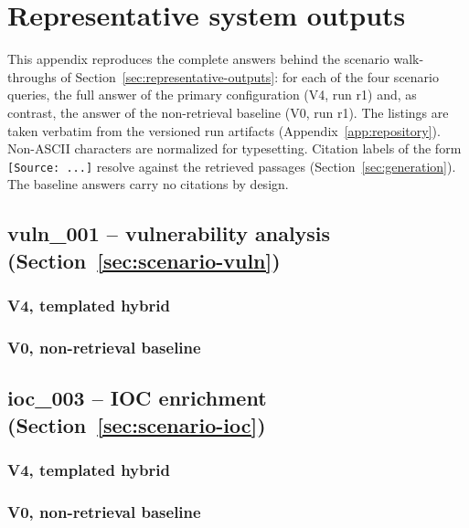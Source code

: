 \chapter{Representative system outputs}
\label{app:outputs}

This appendix reproduces the complete answers behind the scenario
walk-throughs of Section~\ref{sec:representative-outputs}: for each of
the four scenario queries, the full answer of the primary
configuration (V4, run r1) and, as contrast, the answer of the
non-retrieval baseline (V0, run r1). The listings are taken verbatim
from the versioned run artifacts
(Appendix~\ref{app:repository}). Non-ASCII characters are normalized
for typesetting. Citation labels of the form
\texttt{[Source:~...]} resolve against the retrieved passages
(Section~\ref{sec:generation}). The baseline answers carry no
citations by design.

\section*{vuln\_001 -- vulnerability analysis (Section~\ref{sec:scenario-vuln})}

\subsection*{V4, templated hybrid}


\subsection*{V0, non-retrieval baseline}


\section*{ioc\_003 -- IOC enrichment (Section~\ref{sec:scenario-ioc})}

\subsection*{V4, templated hybrid}


\subsection*{V0, non-retrieval baseline}


